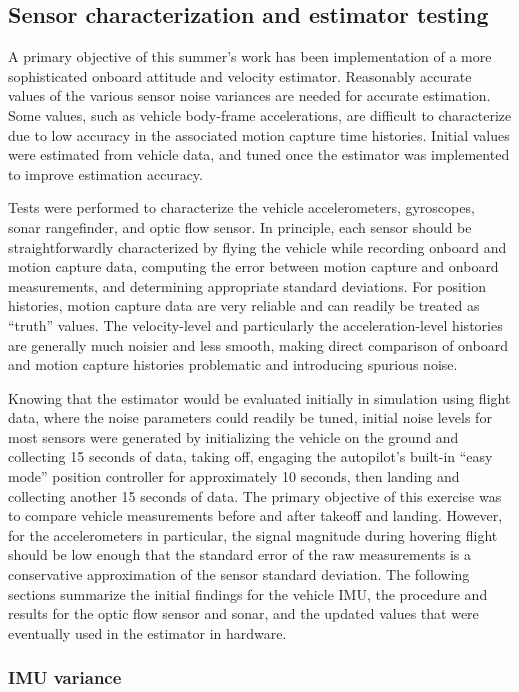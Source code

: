 \documentclass{article}
\begin{document}
\subsection{Sensor characterization and estimator testing}

A primary objective of this summer's work has been implementation of a more sophisticated onboard attitude and velocity estimator. Reasonably accurate values of the various sensor noise variances are needed for accurate estimation. Some values, such as vehicle body-frame accelerations, are difficult to characterize due to low accuracy in the associated motion capture time histories. Initial values were estimated from vehicle data, and tuned once the estimator was implemented to improve estimation accuracy.

Tests were performed to characterize the vehicle accelerometers, gyroscopes, sonar rangefinder, and optic flow sensor. In principle, each sensor should be straightforwardly characterized by flying the vehicle while recording onboard and motion capture data, computing the error between motion capture and onboard measurements, and determining appropriate standard deviations. For position histories, motion capture data are very reliable and can readily be treated as ``truth'' values. The velocity-level and particularly the acceleration-level histories are generally much noisier and less smooth, making direct comparison of onboard and motion capture histories problematic and introducing spurious noise.

Knowing that the estimator would be evaluated initially in simulation using flight data, where the noise parameters could readily be tuned, initial noise levels for most sensors were generated by initializing the vehicle on the ground and collecting 15 seconds of data, taking off, engaging the autopilot's built-in ``easy mode'' position controller for approximately 10 seconds, then landing and collecting another 15 seconds of data. The primary objective of this exercise was to compare vehicle measurements before and after takeoff and landing. However, for the accelerometers in particular, the signal magnitude during hovering flight should be low enough that the standard error of the raw measurements is a conservative approximation of the sensor standard deviation. The following sections summarize the initial findings for the vehicle IMU, the procedure and results for the optic flow sensor and sonar, and the updated values that were eventually used in the estimator in hardware.

\subsubsection{IMU variance}
\end{document}

